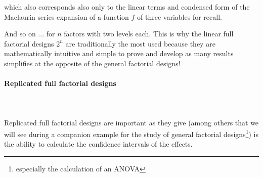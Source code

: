 	which also corresponds also only to the linear terms and condensed form of the Maclaurin series expansion of a function $f$ of three variables for recall.

	And so on ... for $n$ factors with two levels each. This is why the linear full factorial designs $2^n$ are traditionally the most used because they are mathematically intuitive and simple to prove and develop as many results simplifies at the opposite of the general factorial designs!

	\pagebreak
	\paragraph{Replicated full factorial designs}\mbox{}\\\\
	Replicated full factorial designs are important as they give (among others that we will see during a companion example for the study of general factorial designs\footnote{especially the calculation of an ANOVA}) is the ability to calculate the confidence intervals of the effects.
	
